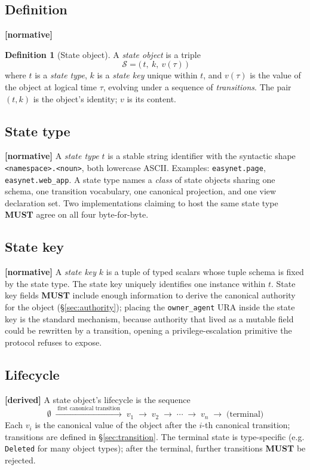 \documentclass[11pt,a4paper]{article}
\newcommand{\normsv}{\textcolor{normativecolor}{\textbf{[normative]}}\xspace}
\newcommand{\derived}{\textcolor{derivedcolor}{\textbf{[derived]}}\xspace}
\theoremstyle{definition}
\newtheorem{definition}{Definition}
\begin{document}
\subsection{Definition}

\normsv{}
\begin{definition}[State object]
A \emph{state object} is a triple
\[
    \mathcal{S} = \bigl(\,t,\ k,\ v(\tau)\,\bigr)
\]
where $t$ is a \emph{state type}, $k$ is a \emph{state key} unique
within $t$, and $v(\tau)$ is the value of the object at logical time
$\tau$, evolving under a sequence of \emph{transitions}. The pair
$(t,k)$ is the object's identity; $v$ is its content.
\end{definition}

\subsection{State type}
\label{sec:state-type}

\normsv{}
A \emph{state type} $t$ is a stable string identifier with the
syntactic shape \texttt{<namespace>.<noun>}, both lowercase ASCII.
Examples: \texttt{easynet.page}, \texttt{easynet.web\_app}.
A state type names a \emph{class} of state objects sharing one
schema, one transition vocabulary, one canonical projection, and
one view declaration set. Two implementations claiming to host the
same state type \textbf{MUST} agree on all four byte-for-byte.

\subsection{State key}
\label{sec:state-key}

\normsv{}
A \emph{state key} $k$ is a tuple of typed scalars whose tuple
schema is fixed by the state type. The state key uniquely
identifies one instance within $t$. State key fields \textbf{MUST}
include enough information to derive the canonical authority for
the object (\S\ref{sec:authority}); placing the
\texttt{owner\_agent} URA inside the state key is the standard
mechanism, because authority that lived as a mutable field could
be rewritten by a transition, opening a privilege-escalation
primitive the protocol refuses to expose.

\subsection{Lifecycle}

\derived{} A state object's lifecycle is the sequence
\[
    \emptyset \;\xrightarrow{\;\text{first canonical transition}\;}\; v_1
    \;\to\; v_2 \;\to\; \cdots \;\to\; v_n \;\to\; \text{(terminal)}
\]
Each $v_i$ is the canonical value of the object after the
$i$-th canonical transition; transitions are defined in
\S\ref{sec:transition}. The terminal state is type-specific (e.g.
\texttt{Deleted} for many object types); after the terminal,
further transitions \textbf{MUST} be rejected.
\end{document}
